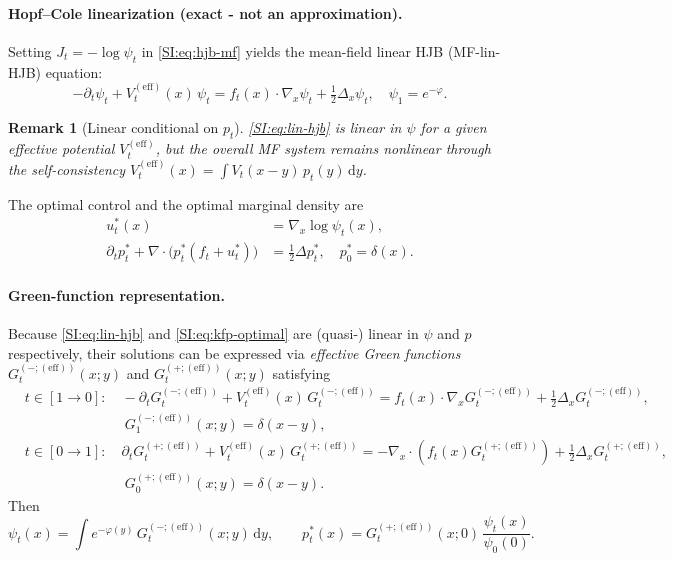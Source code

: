 \documentclass[11pt,onecolumn]{article}
\newcommand{\dd}{\mathrm{d}}
\newcommand{\mfeff}{(\mathrm{eff})}
\newcommand{\Veff}{V^{(\mathrm{eff})}}
\newtheorem{remark}{Remark}[section]
\begin{document}
\paragraph{Hopf--Cole linearization (exact - not an approximation).} Setting $J_t = -\log\psi_t$ in \eqref{SI:eq:hjb-mf} yields the mean-field linear HJB (MF-lin-HJB) equation:
\begin{equation}
  -\partial_t\psi_t + \Veff_t(x)\,\psi_t
  = f_t(x)\cdot\nabla_x\psi_t + \tfrac{1}{2}\Delta_x\psi_t,
  \quad \psi_1 = e^{-\varphi}.
  \label{SI:eq:lin-hjb}
\end{equation}
\begin{remark}[Linear conditional on $p_t$]
\eqref{SI:eq:lin-hjb} is linear in $\psi$
for a given effective potential $\Veff_t$, but the overall MF system
remains nonlinear through the self-consistency $\Veff_t(x)=\int
V_t(x-y)\,p_t(y)\,\dd y$.
\end{remark}

The optimal control and the optimal marginal density are
\begin{align}
  u_t^*(x) &= \nabla_x\log\psi_t(x),
  \label{SI:eq:u-star-terminal}\\
  \partial_t p_t^*
    + \nabla\cdot\bigl(p_t^*(f_t + u_t^*)\bigr)
  &= \tfrac{1}{2}\Delta p_t^*,
  \quad p_0^* = \delta(x).
  \label{SI:eq:kfp-optimal}
\end{align}

\paragraph{Green-function representation.} Because \eqref{SI:eq:lin-hjb} and \eqref{SI:eq:kfp-optimal} are (quasi-) linear in $\psi$ and $p$ respectively, their solutions can be expressed via \emph{effective Green functions} $G_t^{(-;\mfeff)}(x;y)$ and $G_t^{(+;\mfeff)}(x;y)$ satisfying
\begin{align}
  &t\in[1\to0]:\quad
  -\partial_t G_t^{(-;\mfeff)} + \Veff_t(x)\,G_t^{(-;\mfeff)}
  = f_t(x)\cdot\nabla_x G_t^{(-;\mfeff)}
    + \tfrac{1}{2}\Delta_x G_t^{(-;\mfeff)},
  \label{SI:eq:green-minus}\\
  &\hspace{3cm} G_1^{(-;\mfeff)}(x;y) = \delta(x-y), \nonumber\\
  &t\in[0\to1]:\quad
  \partial_t G_t^{(+;\mfeff)} + \Veff_t(x)\,G_t^{(+;\mfeff)}
  = -\nabla_x \cdot \left( f_t(x) G_t^{(+;\mfeff)}\right)
    + \tfrac{1}{2}\Delta_x G_t^{(+;\mfeff)},
  \label{SI:eq:green-plus}\\
  &\hspace{3cm} G_0^{(+;\mfeff)}(x;y) = \delta(x-y). \nonumber
\end{align}
Then
\begin{equation}
  \psi_t(x) = \int e^{-\varphi(y)}\,G_t^{(-;\mfeff)}(x;y)\,\dd y,
  \qquad
  p_t^*(x)
  = G_t^{(+;\mfeff)}(x;0)\,\frac{\psi_t(x)}{\psi_0(0)}.
  \label{SI:eq:psi-p-green}
\end{equation}
\end{document}
